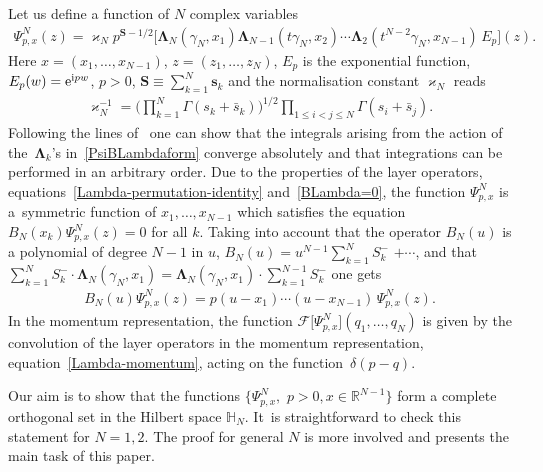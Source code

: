 \documentclass[pdftex]{sigma}%
\numberwithin{equation}{section}
\begin{document}
 Let us define a function of $N$ complex variables %
\begin{gather}\label{PsiBLambdaform}
\Psi^N_{p,{x}}(z)=\varkappa_N p^{\boldsymbol S-1/2}
 \big[
 \boldsymbol\Lambda_N\left(\gamma_N, x_1\right)
 \boldsymbol\Lambda_{N-1}\left(t\gamma_N, x_2\right)\cdots \boldsymbol\Lambda_2\left(t^{N-2}\gamma_N, x_{N-1}\right) \, E_p\big](z).
\end{gather}
Here $ x=(x_1,\dots,x_{N-1})$, $z=(z_1,\dots, z_N)$, $E_p$ is the exponential function,
$E_p(w)={\rm e}^{{\rm i}pw}$, $p>0$, $\boldsymbol
S\equiv\sum_{k=1}^N \boldsymbol s_k$ and the normalisation constant $\varkappa_N$ reads
\begin{gather*}
\varkappa_N^{-1}=\Bigg(\prod_{k=1}^N\Gamma(s_k+\bar s_k)\Bigg)^{1/2} \prod_{1\leq i<j\leq N}\Gamma(s_i+\bar s_j).
\end{gather*}
Following the lines of~\cite{Kozlowski:2014jka} one can show that the integrals arising from the action of the~$\boldsymbol\Lambda_k$'s in~\eqref{PsiBLambdaform} converge absolutely and that integrations can be performed in an arbitrary order. Due
to the properties of the layer operators, equations~\eqref{Lambda-permutation-identity} and~\eqref{BLambda=0}, the function $ \Psi^N_{p,{x}}$
is a~sym\-met\-ric function of $x_1,\dots, x_{N-1}$ which satisfies the equation $B_N(x_k)\Psi^N_{p,{x}}({z})=0$ for all $k$. Taking into
account that the operator $B_N(u)$ is a polynomial of degree $N-1$ in $u$, $B_N(u)= u^{N-1} \sum_{k=1}^{N} S^-_k$ $+\cdots$, and that
$\sum_{k=1}^{N} S^-_k \cdot \boldsymbol\Lambda_N(\gamma_N, x_1) = \boldsymbol\Lambda_N(\gamma_N, x_1) \cdot \sum_{k=1}^{N-1} S^-_k$
one gets
\begin{gather*}
B_N(u) \Psi^N_{p,{x}}({z})=p(u-x_1)\cdots (u-x_{N-1})\,\Psi^N_{p,{x}}({z}).
\end{gather*}
In the momentum representation, the function $ \mathcal{F}\big[\Psi^N_{p,{x}}\big](q_1,\dots,q_N)$ is given by the convolution of the
layer operators in the momentum representation, equation~\eqref{Lambda-momentum}, acting on the func\-tion~$\delta(p-q)$.

Our aim is to show that the functions $\big\{\Psi^N_{p,{x}},\,\, p>0, {x}\in \mathbb R^{N-1}\big\}$ form a complete orthogonal set in the
Hilbert space $\mathbb H_N$. It~is straightforward to check this statement for $N=1,2$. The proof for general $N$ is more involved and
presents the main task of this paper.
\end{document}
